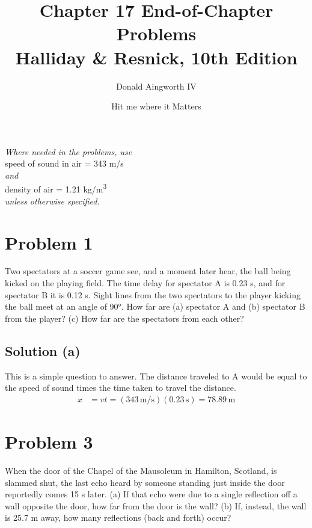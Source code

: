 \documentclass[12pt]{article}
\title{
    Chapter 17 End-of-Chapter Problems
    \\ \small
    Halliday \& Resnick, 10th Edition
}
\author{Donald Aingworth IV}
\date{\small Hit me where it Matters}
\begin{document}

    \maketitle

    \begin{center}
        \textit{Where needed in the problems, use}\\
        speed of sound in air = 343 m/s\\
        \textit{and}\\
        density of air = 1.21 \unit{\kilo\gram/\meter^3}\\
        \textit{unless otherwise specified.}
    \end{center}

    \pagebreak
    \section{Problem 1}
        Two spectators at a soccer game see, and a moment later hear, the ball being kicked on the playing field. 
        The time delay for spectator A is 0.23 s, and for spectator B it is 0.12 s. 
        Sight lines from the two spectators to the player kicking the ball meet at an angle of 90\unit{\degree}. 
        How far are (a) spectator A and (b) spectator B from the player?
        (c) How far are the spectators from each other?

        \subsection{Solution (a)}
            This is a simple question to answer.
            The distance traveled to A would be equal to the speed of sound times the time taken to travel the distance.
            \begin{align}
                x   &=  vt
                    =   (343\,\unit{\meter/\second})(0.23\,\unit{\second})
                    =   \boxed{78.89\,\unit{\meter}}
            \end{align}

    \pagebreak
    \section{Problem 3}
        When the door of the Chapel of the Mausoleum in Hamilton, Scotland, is slammed shut, the last echo heard by someone standing just inside the door reportedly comes 15 s later. 
        (a) If that echo were due to a single reflection off a wall opposite the door, how far from the door is the wall? 
        (b) If, instead, the wall is 25.7 m away, how many reflections (back and forth) occur?
\end{document}
